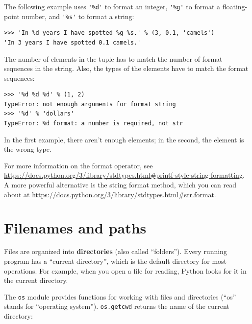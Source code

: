 \documentclass[10pt]{book}
\begin{document}
The following example uses \verb"'%d'" to format an integer,
\verb"'%g'" to format a floating-point number, and
\verb"'%s'" to format a string:

\begin{verbatim}
>>> 'In %d years I have spotted %g %s.' % (3, 0.1, 'camels')
'In 3 years I have spotted 0.1 camels.'
\end{verbatim}
%
The number of elements in the tuple has to match the number
of format sequences in the string.  Also, the types of the
elements have to match the format sequences:

\begin{verbatim}
>>> '%d %d %d' % (1, 2)
TypeError: not enough arguments for format string
>>> '%d' % 'dollars'
TypeError: %d format: a number is required, not str
\end{verbatim}
%
In the first example, there aren't enough elements; in the
second, the element is the wrong type.

For more information on the format operator, see
\url{https://docs.python.org/3/library/stdtypes.html#printf-style-string-formatting}.  A more powerful alternative is the string
format method, which you can read about at
\url{https://docs.python.org/3/library/stdtypes.html#str.format}.




\section{Filenames and paths}
\label{paths}

Files are organized into {\bf directories} (also called ``folders'').
Every running program has a ``current directory'', which is the
default directory for most operations.  
For example, when you open a file for reading, Python looks for it in the
current directory.

The {\tt os} module provides functions for working with files and
directories (``os'' stands for ``operating system'').  {\tt os.getcwd}
returns the name of the current directory:
\end{document}
